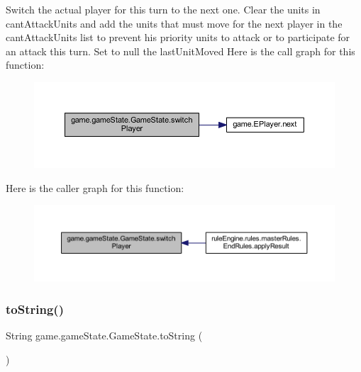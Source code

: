 Switch the actual player for this turn to the next one. Clear the units in cant\+Attack\+Units and add the units that must move for the next player in the cant\+Attack\+Units list to prevent his priority units to attack or to participate for an attack this turn. Set to null the last\+Unit\+Moved Here is the call graph for this function\+:
\nopagebreak
\begin{figure}[H]
\begin{center}
\leavevmode
\includegraphics[width=350pt]{classgame_1_1game_state_1_1_game_state_a8c72ae2f7753681316a4a1d16e183b6e_cgraph}
\end{center}
\end{figure}
Here is the caller graph for this function\+:
\nopagebreak
\begin{figure}[H]
\begin{center}
\leavevmode
\includegraphics[width=350pt]{classgame_1_1game_state_1_1_game_state_a8c72ae2f7753681316a4a1d16e183b6e_icgraph}
\end{center}
\end{figure}
\mbox{\label{classgame_1_1game_state_1_1_game_state_a46d322e319cd211f4a4a90d7bf02d26c}} 
\subsubsection{\texorpdfstring{to\+String()}{toString()}}
{\footnotesize\ttfamily String game.\+game\+State.\+Game\+State.\+to\+String (\begin{DoxyParamCaption}{ }\end{DoxyParamCaption})\hspace{0.3cm}{\ttfamily [inline]}}

